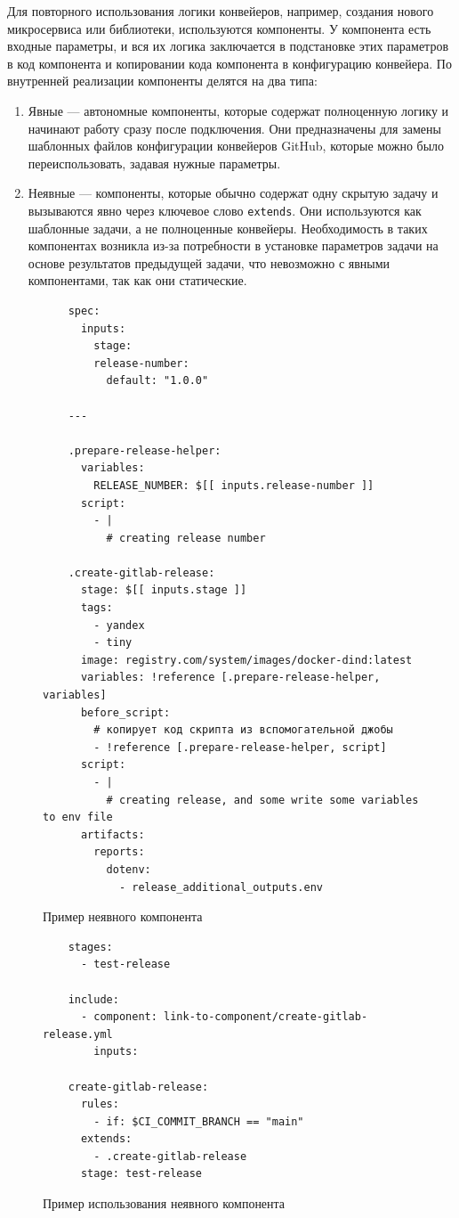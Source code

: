 Для повторного использования логики конвейеров, например, создания нового микросервиса или библиотеки, используются компоненты.
У компонента есть входные параметры, и вся их логика заключается в подстановке этих параметров в код компонента и копировании кода компонента в конфигурацию конвейера.
По внутренней реализации компоненты делятся на два типа:
\begin{enumerate}
  \item Явные — автономные компоненты, которые содержат полноценную логику и начинают работу сразу после подключения.
  Они предназначены для замены шаблонных файлов конфигурации конвейеров GitHub, которые можно было переиспользовать, задавая нужные параметры.
  \item Неявные — компоненты, которые обычно содержат одну скрытую задачу и вызываются явно через ключевое слово \texttt{extends}.
  Они используются как шаблонные задачи, а не полноценные конвейеры.
  Необходимость в таких компонентах возникла из-за потребности в установке параметров задачи на основе результатов предыдущей задачи, что невозможно с явными компонентами, так как они статические.
\end{enumerate}

\begin{figure}
  \centering
  \scriptsize
  \begin{verbatim}
    spec:
      inputs:
        stage:
        release-number:
          default: "1.0.0"

    ---

    .prepare-release-helper:
      variables:
        RELEASE_NUMBER: $[[ inputs.release-number ]]
      script:
        - |
          # creating release number

    .create-gitlab-release:
      stage: $[[ inputs.stage ]]
      tags:
        - yandex
        - tiny
      image: registry.com/system/images/docker-dind:latest
      variables: !reference [.prepare-release-helper, variables]
      before_script:
        # копирует код скрипта из вспомогательной джобы
        - !reference [.prepare-release-helper, script]
      script:
        - |
          # creating release, and some write some variables to env file
      artifacts:
        reports:
          dotenv:
            - release_additional_outputs.env
  \end{verbatim}
  \caption{Пример неявного компонента}
  \label{fig:implicit-component-code}
\end{figure}

\begin{figure}
  \centering
  \scriptsize
  \begin{verbatim}
    stages:
      - test-release

    include:
      - component: link-to-component/create-gitlab-release.yml
        inputs:

    create-gitlab-release:
      rules:
        - if: $CI_COMMIT_BRANCH == "main"
      extends:
        - .create-gitlab-release
      stage: test-release
  \end{verbatim}
  \caption{Пример использования неявного компонента}
  \label{fig:implicit-component-code-usage}
\end{figure}


